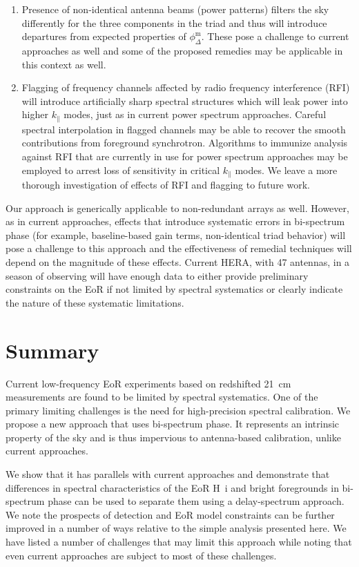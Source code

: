 \documentclass[
reprint,
superscriptaddress,
amsmath,
amssymb,
aps,
prd
]{revtex4-1}
\begin{document}
\begin{enumerate}
\item Presence of non-identical antenna beams (power patterns) filters the sky differently for the three components in the triad and thus will introduce departures from expected properties of $\phi_\Delta^\textrm{m}$. These pose a challenge to current approaches as well and some of the proposed remedies may be applicable in this context as well.
\item Flagging of frequency channels affected by radio frequency interference (RFI) will introduce artificially sharp spectral structures which will leak power into higher $k_\parallel$ modes, just as in current power spectrum approaches. Careful spectral interpolation in flagged channels may be able to recover the smooth contributions from foreground synchrotron. Algorithms to immunize analysis against RFI that are currently in use for power spectrum approaches may be employed to arrest loss of sensitivity in critical $k_\parallel$ modes. We leave a more thorough investigation of effects of RFI and flagging to future work.
\end{enumerate}

Our approach is generically applicable to non-redundant arrays as well. However, as in current approaches, effects that introduce systematic errors in bi-spectrum phase (for example, baseline-based gain terms, non-identical triad behavior) will pose a challenge to this approach and the effectiveness of remedial techniques will depend on the magnitude of these effects. Current HERA, with 47 antennas, in a season of observing will have enough data to either provide preliminary constraints on the EoR if not limited by spectral systematics or clearly indicate the nature of these systematic limitations.

\section{Summary}\label{sec:summary}

Current low-frequency EoR experiments based on redshifted 21~cm measurements are found to be limited by spectral systematics. One of the primary limiting challenges is the need for high-precision spectral calibration. We propose a new approach that uses bi-spectrum phase. It represents an intrinsic property of the sky and is thus impervious to antenna-based calibration, unlike current approaches.
  
We show that it has parallels with current approaches and demonstrate that differences in spectral characteristics of the EoR H~{\sc i} and bright foregrounds in bi-spectrum phase can be used to separate them using a delay-spectrum approach. We note the prospects of detection and EoR model constraints can be further improved in a number of ways relative to the simple analysis presented here. We have listed a number of challenges that may limit this approach while noting that even current approaches are subject to most of these challenges.
  
\end{document}
